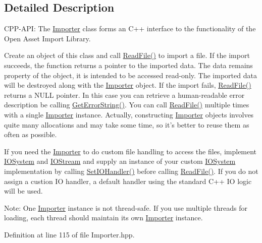 \subsection{Detailed Description}
CPP-API: The \hyperlink{class_assimp_1_1_importer}{Importer} class forms an C++ interface to the functionality of the Open Asset Import Library.

Create an object of this class and call \hyperlink{class_assimp_1_1_importer_174418ab41d5b8bc51a044895cb991e5}{ReadFile()} to import a file. If the import succeeds, the function returns a pointer to the imported data. The data remains property of the object, it is intended to be accessed read-only. The imported data will be destroyed along with the \hyperlink{class_assimp_1_1_importer}{Importer} object. If the import fails, \hyperlink{class_assimp_1_1_importer_174418ab41d5b8bc51a044895cb991e5}{ReadFile()} returns a NULL pointer. In this case you can retrieve a human-readable error description be calling \hyperlink{class_assimp_1_1_importer_23bab5ba8cb9b6886c690a610766668b}{GetErrorString()}. You can call \hyperlink{class_assimp_1_1_importer_174418ab41d5b8bc51a044895cb991e5}{ReadFile()} multiple times with a single \hyperlink{class_assimp_1_1_importer}{Importer} instance. Actually, constructing \hyperlink{class_assimp_1_1_importer}{Importer} objects involves quite many allocations and may take some time, so it's better to reuse them as often as possible.

If you need the \hyperlink{class_assimp_1_1_importer}{Importer} to do custom file handling to access the files, implement \hyperlink{class_assimp_1_1_i_o_system}{IOSystem} and \hyperlink{class_assimp_1_1_i_o_stream}{IOStream} and supply an instance of your custom \hyperlink{class_assimp_1_1_i_o_system}{IOSystem} implementation by calling \hyperlink{class_assimp_1_1_importer_1161f46318af18bb86dfe0fc3edea4df}{SetIOHandler()} before calling \hyperlink{class_assimp_1_1_importer_174418ab41d5b8bc51a044895cb991e5}{ReadFile()}. If you do not assign a custion IO handler, a default handler using the standard C++ IO logic will be used.

\begin{Desc}
\item[Note:]One \hyperlink{class_assimp_1_1_importer}{Importer} instance is not thread-safe. If you use multiple threads for loading, each thread should maintain its own \hyperlink{class_assimp_1_1_importer}{Importer} instance. \end{Desc}


Definition at line 115 of file Importer.hpp.

